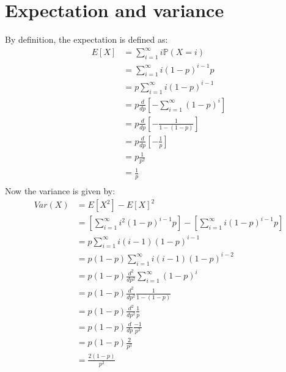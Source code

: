 \documentclass{article}
\renewcommand{\P}{\mathbb{P}}
\begin{document}
\section{Expectation and variance}
By definition, the expectation is defined as:
\begin{align*}
    E[X]
     & = \sum_{i=1}^{\infty} i \P(X = i)                               \\
     & = \sum_{i=1}^{\infty} i (1-p)^{i-1}p                            \\
     & = p \sum_{i=1}^{\infty} i (1-p)^{i-1}                           \\
     & = p \frac{d}{dp} \left[ - \sum_{i=1}^{\infty} (1-p)^{i} \right] \\
     & = p \frac{d}{dp} \left[ - \frac{1}{1 - (1-p)} \right]           \\
     & = p \frac{d}{dp} \left[ - \frac{1}{p} \right]                   \\
     & = p \frac{1}{p^2}                                               \\
     & = \frac{1}{p}                                                   \\
\end{align*}
Now the variance is given by:
\begin{align*}
    Var(X)
     & = E[X^2] - E[X]^2                                                                                           \\
     & = \left[ \sum_{i=1}^{\infty} i^2 (1-p)^{i-1} p \right] - \left[ \sum_{i=1}^{\infty} i (1-p)^{i-1} p \right] \\
     & = p \sum_{i=1}^{\infty} i (i-1) (1-p)^{i-1}                                                                 \\
     & = p(1-p) \sum_{i=1}^{\infty} i (i-1) (1-p)^{i-2}                                                            \\
     & = p(1-p) \frac{d^2}{dp^2} \sum_{i=1}^{\infty} (1-p)^{i}                                                     \\
     & = p(1-p) \frac{d^2}{dp^2} \frac{1}{1 - (1-p)}                                                               \\
     & = p(1-p) \frac{d^2}{dp^2} \frac{1}{p}                                                                       \\
     & = p(1-p) \frac{d}{dp} \frac{-1}{p^2}                                                                        \\
     & = p(1-p) \frac{2}{p^3}                                                                                      \\
     & = \frac{2 (1-p)}{p^2}                                                                                       \\
\end{align*}
\end{document}
